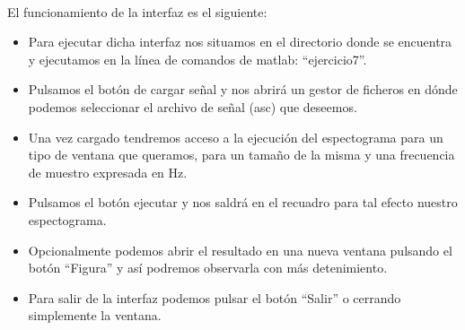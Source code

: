 \documentclass[a4paper,12pt]{article}
\begin{document}
\begin{enumerate}
\\

El funcionamiento de la interfaz es el siguiente:\\
\begin{itemize}
\item Para ejecutar dicha interfaz nos situamos en el directorio donde se encuentra y ejecutamos en la línea de comandos de matlab: ``ejercicio7''.
\item Pulsamos el botón de cargar señal y nos abrirá un gestor de ficheros en dónde podemos seleccionar el archivo de señal (asc) que deseemos.
\item Una vez cargado tendremos acceso a la ejecución del espectograma para un tipo de ventana que queramos, para un tamaño de la misma y una frecuencia de muestro expresada en Hz.
\item Pulsamos el botón ejecutar y nos saldrá en el recuadro para tal efecto nuestro espectograma.
\item Opcionalmente podemos abrir el resultado en una nueva ventana pulsando el botón ``Figura'' y así podremos observarla con más detenimiento.
\item Para salir de la interfaz podemos pulsar el botón ``Salir'' o cerrando simplemente la ventana.
\end{itemize}
\end{enumerate}
\end{document}
